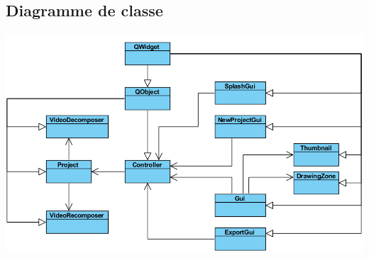 \subsection{Diagramme de classe}
	\begin{center}
		\includegraphics[width=18cm]{./figures/diagramme.png}
	\end{center}
